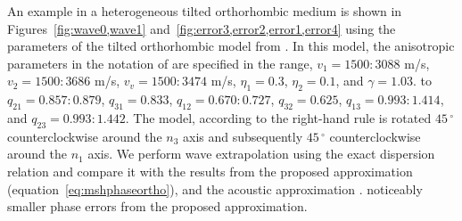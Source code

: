 

An example in a heterogeneous tilted orthorhombic medium is shown in Figures~\ref{fig:wave0,wave1} and~\ref{fig:error3,error2,error1,error4} 
using the parameters of the tilted orthorhombic model from \cite{song}. In this model, the anisotropic parameters in the notation of \cite{alkaortho} are specified in the range, $v_1 = 1500:3088$ m/s, $v_2 = 1500:3686$ m/s, $v_v = 1500:3474$ m/s, $\eta_1=0.3$, $\eta_2=0.1$, and $\gamma=1.03$. 
 to $q_{21}=0.857:0.879$, $q_{31}=0.833$, $q_{12}=0.670:0.727$, $q_{32}=0.625$, $q_{13}=0.993:1.414$, and $q_{23}=0.993:1.442$. The model, according to the right-hand rule is rotated $45\,^{\circ}$ counterclockwise around the $n_3$ axis and subsequently $45\,^{\circ}$ counterclockwise around the $n_1$ axis. We perform wave extrapolation using the exact dispersion relation and compare it with the results from the proposed approximation (equation~\ref{eq:mshphaseortho}), and the acoustic approximation \cite[]{alkaortho,song}.   noticeably smaller phase errors from the proposed approximation.

